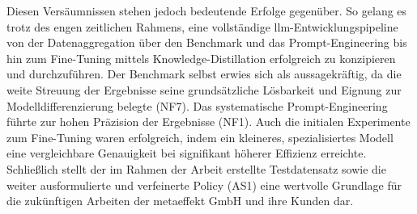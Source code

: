 Diesen Versäumnissen stehen jedoch bedeutende Erfolge gegenüber.
So gelang es trotz des engen zeitlichen Rahmens, eine vollständige \gls{llm}-Entwicklungspipeline von der Datenaggregation über den Benchmark und das Prompt-Engineering bis hin zum Fine-Tuning mittels Knowledge-Distillation erfolgreich zu konzipieren und durchzuführen.
Der Benchmark selbst erwies sich als aussagekräftig, da die weite Streuung der Ergebnisse seine grundsätzliche Lösbarkeit und Eignung zur Modelldifferenzierung belegte (NF7).
Das systematische Prompt-Engineering führte zur hohen Präzision der Ergebnisse (NF1).
Auch die initialen Experimente zum Fine-Tuning waren erfolgreich, indem ein kleineres, spezialisiertes Modell eine vergleichbare Genauigkeit bei signifikant höherer Effizienz erreichte.
Schließlich stellt der im Rahmen der Arbeit erstellte Testdatensatz sowie die weiter ausformulierte und verfeinerte Policy (AS1) eine wertvolle Grundlage für die zukünftigen Arbeiten der metaeffekt GmbH und ihre Kunden dar.

